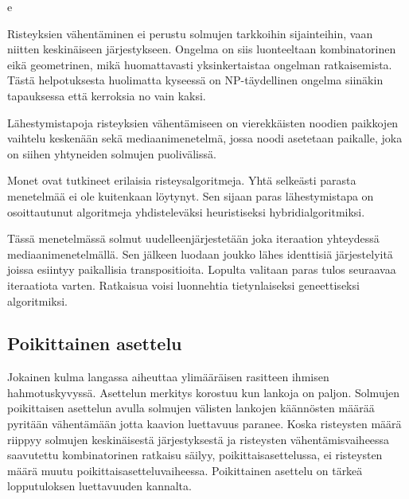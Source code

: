 e	\documentclass[finnish,12pt]{article}
\begin{document}
Risteyksien vähentäminen ei perustu solmujen tarkkoihin sijainteihin, vaan
niitten keskinäiseen järjestykseen. Ongelma on siis luonteeltaan kombinatorinen
eikä geometrinen, mikä huomattavasti yksinkertaistaa ongelman ratkaisemista.
Tästä helpotuksesta huolimatta kyseessä on NP-täydellinen ongelma siinäkin
tapauksessa että kerroksia no vain kaksi. \cite{RefWorks:40}

Lähestymistapoja risteyksien vähentämiseen on vierekkäisten noodien paikkojen
vaihtelu keskenään sekä mediaanimenetelmä, jossa noodi asetetaan paikalle, joka
on siihen yhtyneiden solmujen puolivälissä.

Monet ovat tutkineet erilaisia risteysalgoritmeja.
Yhtä selkeästi parasta menetelmää ei ole kuitenkaan löytynyt.
Sen sijaan paras lähestymistapa on osoittautunut algoritmeja
yhdisteleväksi heuristiseksi hybridialgoritmiksi.

Tässä menetelmässä solmut uudelleenjärjestetään joka iteraation yhteydessä mediaanimenetelmällä.
Sen jälkeen luodaan joukko lähes identtisiä järjestelyitä joissa esiintyy paikallisia transpositioita.
Lopulta valitaan paras tulos seuraavaa iteraatiota varten.
Ratkaisua voisi luonnehtia tietynlaiseksi geneettiseksi algoritmiksi.


		\subsection{Poikittainen asettelu}

Jokainen kulma langassa aiheuttaa ylimääräisen rasitteen ihmisen hahmotuskyvyssä. \cite{RefWorks:44}
Asettelun merkitys korostuu kun lankoja on paljon.
Solmujen poikittaisen asettelun avulla solmujen välisten lankojen käännösten
määrää pyritään vähentämään jotta kaavion luettavuus paranee.
Koska risteysten määrä riippyy solmujen keskinäisestä järjestyksestä ja
risteysten vähentämisvaiheessa saavutettu kombinatorinen ratkaisu säilyy, poikittaisasettelussa,
ei risteysten määrä muutu poikittaisasetteluvaiheessa.
Poikittainen asettelu on tärkeä lopputuloksen luettavuuden kannalta.

	\clearpage
\end{document}
